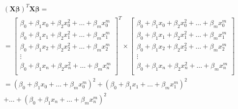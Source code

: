\documentclass{article}
\newcommand{\X}{\mathbf{X}}
\newcommand{\B}{\boldsymbol\beta} %
\begin{document}
\begin{equation} \label{eqn:axtax}
\begin{split}
    & (\X\B)^T \X\B = \\
    & =
    \begin{bmatrix}
        \beta_0 + \beta_1 x_0 + \beta_2 x_0 ^2 + \ldots + \beta_m x_0^m \\
        \beta_0 + \beta_1 x_1 + \beta_2 x_1 ^2 + \ldots + \beta_m x_1^m \\
        \beta_0 + \beta_1 x_2 + \beta_2 x_2 ^2 + \ldots + \beta_m x_2^m \\
        \vdots \\
        \beta_0 + \beta_1 x_n + \beta_2 x_n ^2 + \ldots + \beta_m x_n^m \\
    \end{bmatrix} ^T
    \times
    \begin{bmatrix}
        \beta_0 + \beta_1 x_0 + \beta_2 x_0 ^2 + \ldots + \beta_m x_0^m \\
        \beta_0 + \beta_1 x_1 + \beta_2 x_1 ^2 + \ldots + \beta_m x_1^m \\
        \beta_0 + \beta_1 x_2 + \beta_2 x_2 ^2 + \ldots + \beta_m x_2^m \\
        \vdots \\
        \beta_0 + \beta_1 x_n + \beta_2 x_n ^2 + \ldots + \beta_m x_n^m \\
    \end{bmatrix} \\
    & = (\beta_0 + \beta_1 x_0 + \ldots + \beta_m x_0^m)^ 2 + (\beta_0 + \beta_1 x_1 + \ldots + \beta_m x_1^m)^ 2\\
    & + \ldots + (\beta_0 + \beta_1 x_n + \ldots + \beta_m x_n^m)^ 2
\end{split}
\end{equation}
\end{document}
